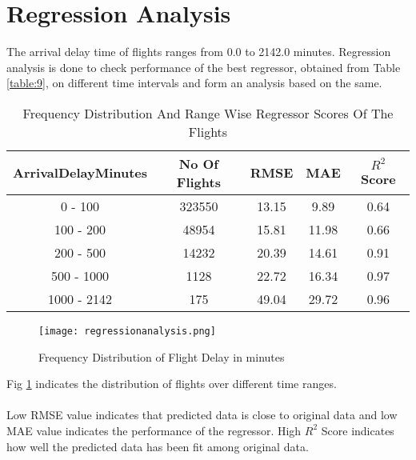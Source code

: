 \documentclass[12pt,letter-paper]{article}
\begin{document}
\section{Regression Analysis}
    The arrival delay time of flights ranges from 0.0 to 2142.0 minutes. Regression analysis is done to check performance of the best regressor, obtained from Table \ref{table:9}, on different time intervals and form an analysis based on the same.
    
    \begin{table}[H]
            \centering
            \begin{tabular}{ |c|c|c|c|c| } 
                \hline
                ArrivalDelayMinutes & No Of Flights & RMSE & MAE & $R^2$ Score\\ 
                \hline
                0 - 100 & 323550 & 13.15 & 9.89 & 0.64\\ 
                \hline
                100 - 200 & 48954 & 15.81 & 11.98 & 0.66\\ 
                \hline
                200 - 500 & 14232 & 20.39 & 14.61 & 0.91\\ 
                \hline
                500 - 1000 & 1128 & 22.72 & 16.34 & 0.97\\ 
                \hline
                1000 - 2142 & 175 & 49.04 & 29.72 & 0.96\\ 
                \hline
            \end{tabular}
            \caption{Frequency Distribution And Range Wise Regressor Scores Of The Flights}
            \label{table:10}
        \end{table}
    
    \begin{figure}[H]%
        \begin{center}
            \texttt{[image: regressionanalysis.png]}%
                \caption{Frequency Distribution of Flight Delay in minutes}  \label{fig:4}
        \end{center}
    \end{figure}
    
    Fig \ref{fig:4} indicates the distribution of flights over different time ranges. 
    
    \paragraph{}
    Low RMSE value indicates that predicted data is close to original data and low MAE value indicates the performance of the regressor. High $R^2$ Score indicates how well the predicted data has been fit among original data.
    
\end{document}
